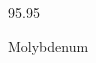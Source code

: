 \documentclass[12pt]{article}
\begin{document}
\hfill{}
\vfill
\begin{center}
  {\fontsize{50}{60}
  }

  95.95

Molybdenum
\end{center}
\vfill
\end{document}

